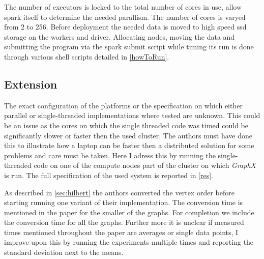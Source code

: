 The number of executors is locked to the total number of cores in use, allow spark itself to determine the needed parallism. The number of cores is varyed from 2 to 256. Before deployment the needed data is moved to high speed ssd storage on the workers and driver. 
Allocating nodes, moving the data and submitting the program via the spark submit script while timing its run is done through various shell scripts detailed in \cref{howToRun}.

\subsection{Extension}
The exact configuration of the platforms or the specification on which either parallel or single-threaded implementations where tested are unknown. This could be an issue as the cores on which the single threaded code was timed could be significantly slower or faster then the used cluster. The authors must have done this to illustrate how a laptop can be faster then a distributed solution for some problems and care must be taken. Here I adress this by running the single-threaded code on one of the compute nodes part of the cluster on which \textit{GraphX} is run. The full specification of the used system is reported in \cref{res}.

As described in \cref{sec:hilbert} the authors converted the vertex order before starting running one variant of their implementation. The conversion time is mentioned in the paper for the smaller of the graphs. For completion we include the conversion time for all the graphs. 
Further more it is unclear if measured times mentioned throughout the paper are averages or single data points, I improve upon this by running the experiments multiple times and reporting the standard deviation next to the means.
